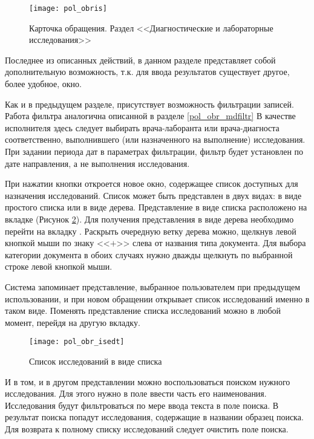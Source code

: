  \begin{figure}[ht]\centering
   \texttt{[image: pol\_obris]}
   \caption{Карточка обращения. Раздел <<Диагностические и лабораторные исследования>>}
   \label{img_pol_obris}
 \end{figure}
 
Последнее из описанных действий, в данном разделе представляет собой дополнительную возможность, т.к. для ввода результатов существует другое, более удобное, окно.

Как и в предыдущем разделе, присутствует возможность фильтрации записей. Работа фильтра аналогична описанной в разделе \ref{pol_obr_mdfiltr} В качестве исполнителя здесь следует выбирать врача-лаборанта или врача-диагноста соответственно, выполнившего (или назначенного на выполнение) исследования. При задании периода дат в параметрах фильтрации, фильтр будет установлен по дате направления, а не выполнения исследования.

При нажатии кнопки   откроется новое окно, содержащее список доступных для назначения исследований. Список может быть представлен в двух видах: в виде простого списка или в виде дерева. Представление в виде списка расположено на вкладке  (Рисунок \ref{img_pol_obr_isedt}). Для получения представления в виде дерева необходимо перейти на вкладку . Раскрыть очередную ветку дерева можно, щелкнув левой кнопкой мыши по знаку <<$+$>> слева от названия типа документа. Для выбора категории документа в обоих случаях нужно дважды щелкнуть по выбранной строке левой кнопкой мыши.

Система запоминает представление, выбранное пользователем при предыдущем использовании, и при новом обращении открывает список исследований именно в таком виде. Поменять представление списка исследований можно в любой момент, перейдя на другую вкладку.

 \begin{figure}[ht]\centering
   \texttt{[image: pol\_obr\_isedt]}
   \caption{Список исследований в виде списка}
   \label{img_pol_obr_isedt}
 \end{figure}  
 
И в том, и в другом представлении можно воспользоваться поиском нужного исследования. Для этого нужно в поле  ввести часть его наименования. Исследования  будут фильтроваться по мере ввода текста в поле поиска. В результат поиска попадут исследования, содержащие в названии образец поиска. Для возврата к полному списку исследований следует очистить поле поиска.

